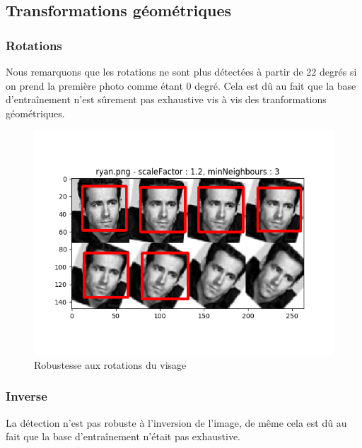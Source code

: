 \documentclass[a4paper,11pt]{article}
\begin{document}
    \subsection{Transformations géométriques}

	\subsubsection{Rotations}
	    
	    Nous remarquons que les rotations ne sont plus détectées à partir de 22 degrés si on prend la
	    première photo comme étant 0 degré. Cela est dû au fait que la base d'entraînement n'est
	    sûrement pas exhaustive vis à vis des tranformations géométriques.

	    \begin{figure}[H]
	        \begin{center}
		   \includegraphics[scale = 0.6]{images/ryan_1,2_3.png}
		   \caption{Robustesse aux rotations du visage}
		   \label{fig:edward}
	        \end{center}
	    \end{figure}

	\subsubsection{Inverse}

	    La détection n'est pas robuste à l'inversion de l'image, de même cela est dû au fait que
	    la base d'entraînement n'était pas exhaustive.
\end{document}
